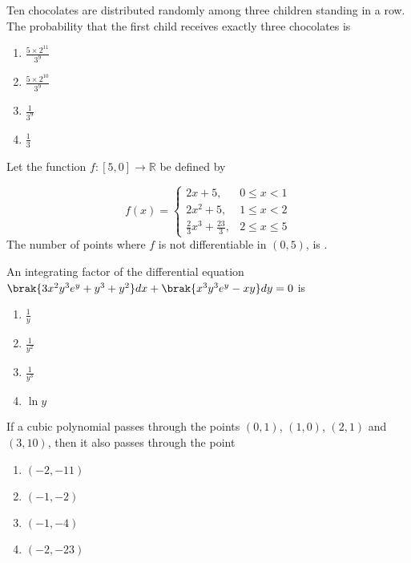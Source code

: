 \iffalse
\chapter{2014}
\author{EE24BTECH11019 - Dwarak A}
\section{xe}
\fi

    \item Ten chocolates are distributed randomly among three children standing in a row. The probability that the first child receives exactly three chocolates is 
        \begin{enumerate}
            \item $\frac{5\times2^{11}}{3^9}$
            \item $\frac{5\times2^{10}}{3^9}$
            \item $\frac{1}{3^9}$
            \item $\frac{1}{3}$
        \end{enumerate}
    
    \item Let the function $f:[5,0]\to\mathbb{R}$ be defined by

        $$f(x)=
        \begin{cases}
            2x + 5, & 0 \leq x < 1 \\ 
            2x^2 + 5, & 1 \leq x < 2 \\ 
            \frac{2}{3}x^3 + \frac{23}{3}, & 2 \leq x \leq 5 
        \end{cases}$$
        The number of points where $f$ is not differentiable in $(0,5)$, is \underline{\hspace{1.5cm}}.
    
    \item An integrating factor of the differential equation $\brak{3x^2y^3e^y+y^3+y^2}dx+\brak{x^3y^3e^y-xy}dy=0$ is
        \begin{enumerate}
            \item $\frac{1}{y}$
            \item $\frac{1}{y^2}$
            \item $\frac{1}{y^3}$
            \item $\ln{y}$
        \end{enumerate}

    \item If a cubic polynomial passes through the points $(0, 1)$, $(1, 0)$, $(2, 1)$ and $(3, 10)$, then it also passes through the point 
        \begin{enumerate}
            \item $(-2,-11)$
            \item $(-1,-2)$
            \item $(-1,-4)$
            \item $(-2,-23)$
        \end{enumerate}


